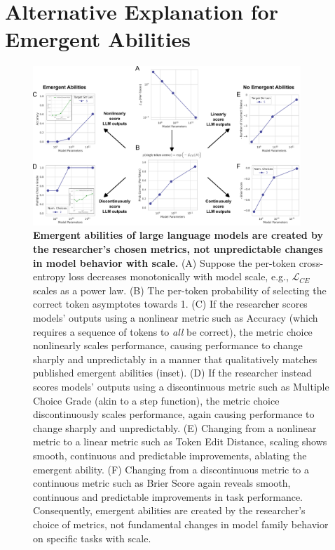 \section{Alternative Explanation for Emergent Abilities}
\label{sec:alt_explanation}

\begin{figure}
    \centering
    \includegraphics[width=0.9\textwidth]{figures/toy_emergence/toy_analytical_model_try2.pdf}
    \caption{\textbf{Emergent abilities of large language models are created by the researcher's chosen metrics, not unpredictable changes in model behavior with scale.} (A) Suppose the per-token cross-entropy loss decreases monotonically with model scale, e.g., $\mathcal{L}_{CE}$ scales as a power law. (B) The per-token probability of selecting the correct token asymptotes towards 1. (C) If the researcher scores models' outputs using a nonlinear metric such as Accuracy (which requires a sequence of tokens to \textit{all} be correct), the metric choice nonlinearly scales performance, causing performance to change sharply and unpredictably in a manner that qualitatively matches published emergent abilities (inset). (D) If the researcher instead scores models' outputs using a discontinuous metric such as Multiple Choice Grade (akin to a step function), the metric choice discontinuously scales performance, again causing performance to change sharply and unpredictably. (E) Changing from a nonlinear metric to a linear metric such as Token Edit Distance, scaling shows smooth, continuous and predictable improvements, ablating the emergent ability. (F) Changing from a discontinuous metric to a continuous metric such as Brier Score again reveals smooth, continuous and predictable improvements in task performance. Consequently, emergent abilities are created by the researcher's choice of metrics, not fundamental changes in model family behavior on specific tasks with scale.}
    \label{fig:toy_model}
\end{figure}

